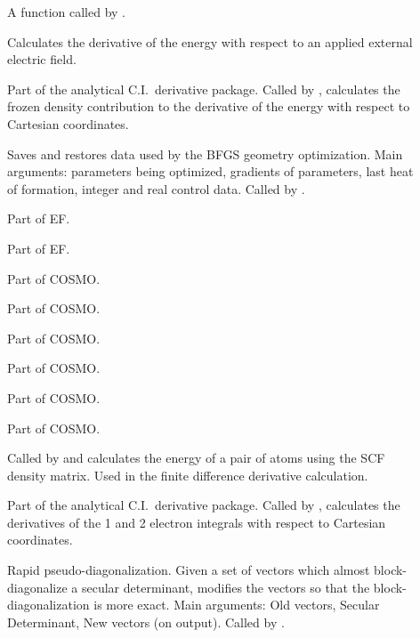 \begin{description}
\item[] A function called by .

\item[] Calculates the derivative  of the energy
with respect to an applied external electric field.

\item[] Part of the analytical C.I.\ derivative package. Called by
,  calculates the frozen density contribution to  the
derivative of the energy with respect to Cartesian coordinates.

\item[] Saves and restores data used by the  BFGS geometry
optimization. Main arguments: parameters being optimized, gradients of
parameters, last heat  of formation, integer and real control data. Called by
.

\item[] Part of EF.

\item[] Part of EF.

\item[] Part of COSMO.

\item[] Part of COSMO.

\item[] Part of COSMO.

\item[] Part of COSMO.

\item[] Part of COSMO.

\item[] Part of COSMO.

\item[] Called by  and calculates the energy of a pair of
atoms using the SCF density matrix.  Used in the finite difference derivative
calculation.

\item[] Part of the analytical C.I.\ derivative package. Called by
,  calculates the derivatives of the 1 and 2  electron
integrals with respect to Cartesian coordinates.

\item[] Rapid pseudo-diagonalization. Given a set of vectors which
almost block-diagonalize a secular determinant,  modifies the
vectors so that the block-dia\-gon\-al\-iz\-at\-ion is more exact. Main
arguments: Old vectors, Secular Determinant,  New vectors (on output).  Called
by .


\end{description}

